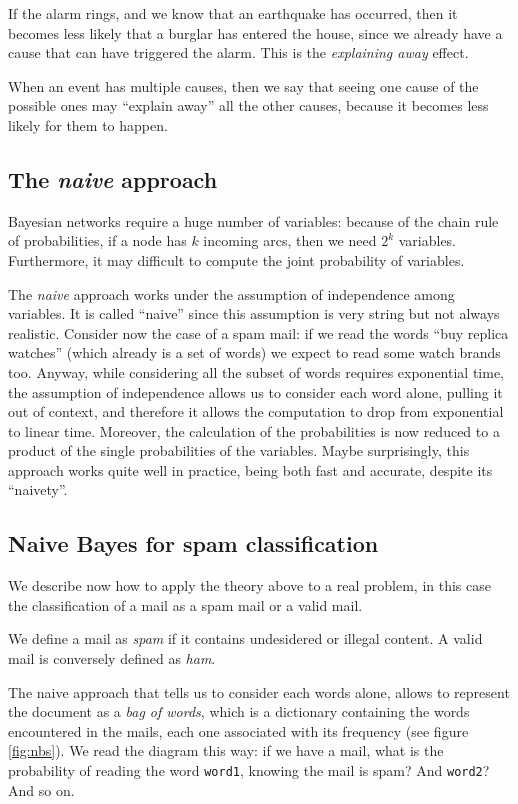If the alarm rings, and we know that an earthquake has occurred, then it becomes less likely that a burglar has entered the house, since we already have a cause that can have triggered the alarm. This is the \textit{explaining away} effect.

When an event has multiple causes, then we say that seeing one cause of the possible ones may ``explain away'' all the other causes, because it becomes less likely for them to happen.

\subsection{The \textit{naive} approach}
Bayesian networks require a huge number of variables: because of the chain rule of probabilities, if a node has $k$ incoming arcs, then we need $2^k$ variables. Furthermore, it may difficult to compute the joint probability of variables.

The \textit{naive} approach works under the assumption of independence among variables. It is called ``naive'' since this assumption is very string but not always realistic. Consider now the case of a spam mail: if we read the words ``buy replica watches'' (which already is a set of words) we expect to read some watch brands too. Anyway, while considering all the subset of words requires exponential time, the assumption of independence allows us to consider each word alone, pulling it out of context, and therefore it allows the computation to drop from exponential to linear time. Moreover, the calculation of the probabilities is now reduced to a product of the single probabilities of the variables. Maybe surprisingly, this approach works quite well in practice, being both fast and accurate, despite its ``naivety''.

\subsection{Naive Bayes for spam classification}
We describe now how to apply the theory above to a real problem, in this case the classification of a mail as a spam mail or a valid mail.

We define a mail as \textit{spam} if it contains undesidered or illegal content. A valid mail is conversely defined as \textit{ham}.

The naive approach that tells us to consider each words alone, allows to represent the document as a \textit{bag of words}, which is a dictionary containing the words encountered in the mails, each one associated with its frequency (see figure \ref{fig:nbs}). We read the diagram this way: if we have a mail, what is the probability of reading the word \verb!word1!, knowing the mail is spam? And \verb!word2!? And so on.

